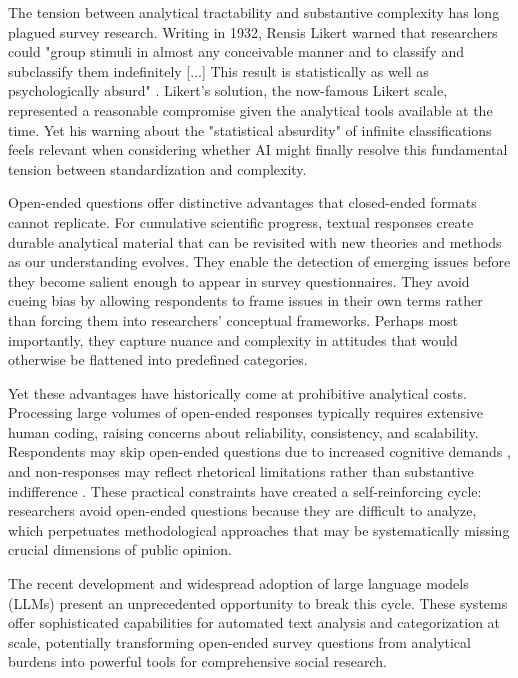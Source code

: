 \documentclass[
  journal=ram,
  manuscript=article-type,
  year=2025,
  volume=unpublished,
]{cup-journal}
\begin{document}
The tension between analytical tractability and substantive complexity has long plagued survey research.
Writing in 1932, Rensis Likert warned that researchers could "group stimuli in almost any conceivable manner and to classify and subclassify them indefinitely [...] This result is statistically as well as psychologically absurd" \citep{likert32a}.
Likert's solution, the now-famous Likert scale, represented a reasonable compromise given the analytical tools available at the time.
Yet his warning about the "statistical absurdity" of infinite classifications feels relevant when considering whether AI might finally resolve this fundamental tension between standardization and complexity.

Open-ended questions offer distinctive advantages that closed-ended formats cannot replicate.
For cumulative scientific progress, textual responses create durable analytical material that can be revisited with new theories and methods as our understanding evolves.
They enable the detection of emerging issues before they become salient enough to appear in survey questionnaires.
They avoid cueing bias by allowing respondents to frame issues in their own terms rather than forcing them into researchers' conceptual frameworks.
Perhaps most importantly, they capture nuance and complexity in attitudes that would otherwise be flattened into predefined categories.

Yet these advantages have historically come at prohibitive analytical costs.
Processing large volumes of open-ended responses typically requires extensive human coding, raising concerns about reliability, consistency, and scalability.
Respondents may skip open-ended questions due to increased cognitive demands \citep{dillman_etal14a}, and non-responses may reflect rhetorical limitations rather than substantive indifference \citep{geer88}.
These practical constraints have created a self-reinforcing cycle: researchers avoid open-ended questions because they are difficult to analyze, which perpetuates methodological approaches that may be systematically missing crucial dimensions of public opinion.

The recent development and widespread adoption of large language models (LLMs) present an unprecedented opportunity to break this cycle.
These systems offer sophisticated capabilities for automated text analysis and categorization at scale, potentially transforming open-ended survey questions from analytical burdens into powerful tools for comprehensive social research.
\end{document}
